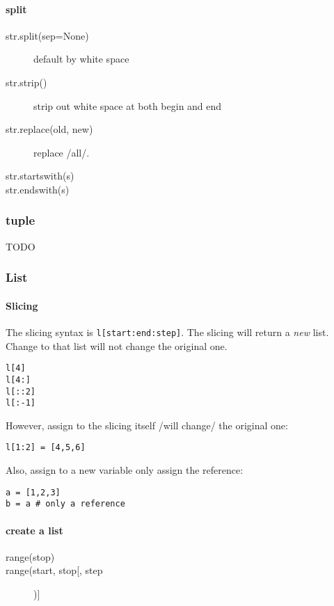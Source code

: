 \paragraph{split}
\begin{description}
\item [str.split(sep=None)] default by white space
\item [str.strip()] strip out white space at both begin and end
\item [str.replace(old, new)] replace /all/.
\item [str.startswith(s)]
\item [str.endswith(s)]
\end{description}

\subsubsection{tuple}
TODO
\subsubsection{ List}
\paragraph{Slicing}
The slicing syntax is \texttt{l[start:end:step]}.
The slicing will return a \textit{new} list. Change to that list will not change the original one.

\begin{lstlisting}
l[4]
l[4:]
l[::2]
l[:-1]
\end{lstlisting}

However, assign to the slicing itself /will change/ the original one:
\begin{lstlisting}
l[1:2] = [4,5,6]
\end{lstlisting}

Also, assign to a new variable only assign the reference:
\begin{lstlisting}
a = [1,2,3]
b = a # only a reference
\end{lstlisting}

\paragraph{create a list}
\begin{description}
\item [range(stop)]
\item [range(start, stop[, step])]
\end{description}


